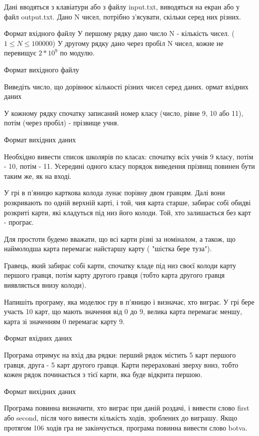 \documentclass[]{article}
\begin{document}
Дані вводяться з клавіатури або з файлу input.txt, виводяться на екран або у файл output.txt.
 Дано N чисел, потрібно з'ясувати, скільки серед них різних.

Формат вхідного файлу
У першому рядку дано число N - кількість чисел. ($1 \le N \le 100000$)
У другому рядку дано через пробіл N чисел, кожне не перевищує $2 * 10^9$ по модулю.


Формат вихідного файлу

Виведіть число, що дорівнює кількості різних чисел серед даних.
ормат вхідних даних

У кожному рядку спочатку записаний номер класу (число, рівне 9, 10 або 11), потім (через пробіл) - прізвище учня.

Формат вихідних даних

Необхідно вивести список школярів по класах: спочатку всіх учнів 9 класу, потім - 10, потім - 11. Усередині одного класу порядок виведення прізвищ повинен бути таким же, як на вході.

У грі в п'яницю карткова колода лунає порівну двом гравцям. Далі вони розкривають по одній верхній карті, і той, чия карта старше, забирає собі обидві розкриті карти, які кладуться під низ його колоди. Той, хто залишається без карт - програє.

Для простоти будемо вважати, що всі карти різні за номіналом, а також, що наймолодша карта перемагає найстаршу карту ( "шістка бере туза").

Гравець, який забирає собі карти, спочатку кладе під низ своєї колоди карту першого гравця, потім карту другого гравця (тобто карта другого гравця виявляється внизу колоди).

Напишіть програму, яка моделює гру в п'яницю і визначає, хто виграє. У грі бере участь 10 карт, що мають значення від 0 до 9, велика карта перемагає меншу, карта зі значенням 0 перемагає карту 9.

Формат вхідних даних

Програма отримує на вхід два рядки: перший рядок містить 5 карт першого гравця, друга - 5 карт другого гравця. Карти перераховані зверху вниз, тобто кожен рядок починається з тієї карти, яка буде відкрита першою.

Формат вихідних даних

Програма повинна визначити, хто виграє при даній роздачі, і вивести слово first або second, після чого вивести кількість ходів, зроблених до виграшу. Якщо протягом 106 ходів гра не закінчується, програма повинна вивести слово botva.
\end{document}
